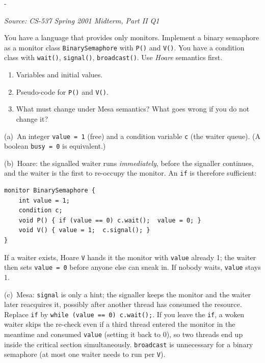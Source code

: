 \documentclass[11pt,a4paper]{article}
\makeatletter
\newcommand{\keepspace}[1]{\par\penalty-100\begingroup
  \setlength{\dimen@}{#1}\dimen@ii\pagegoal\advance\dimen@ii-\pagetotal
  \ifdim\dimen@>\dimen@ii\ifdim\dimen@ii>\z@\vfil\fi\break\fi\endgroup}
\newcounter{qn}[section]
\newenvironment{Qn}[4]{%
  \refstepcounter{qn}\keepspace{7\baselineskip}%
  \begin{tcolorbox}[qboxstyle, title={Q\thesection.\theqn\ \ [#1 \textbar\ #2]\ \ #4}]%
  {\footnotesize\color{g3}\textit{Source: #3}}\par\smallskip%
}{%
  \end{tcolorbox}%
}
\newenvironment{Sol}{%
  \begin{tcolorbox}[sboxstyle, title={Solution}]%
}{%
  \end{tcolorbox}\vspace{0.35em}%
}
\makeatother
\begin{document}
\begin{Qn}{Medium-Hard}{Lect 19}{CS-537 Spring 2001 Midterm, Part II Q1}{Binary semaphore from a Hoare (then Mesa) monitor}
You have a language that provides only monitors. Implement a binary
semaphore as a monitor class \texttt{BinarySemaphore} with \texttt{P()}
and \texttt{V()}. You have a condition class with \texttt{wait()},
\texttt{signal()}, \texttt{broadcast()}. Use \emph{Hoare} semantics first.

\begin{enumerate}
  \item[(a)] Variables and initial values.
  \item[(b)] Pseudo-code for \texttt{P()} and \texttt{V()}.
  \item[(c)] What must change under Mesa semantics? What goes wrong if you
        do not change it?
\end{enumerate}
\end{Qn}
\begin{Sol}
(a)~An integer \texttt{value = 1} (free) and a condition variable
\texttt{c} (the waiter queue). (A boolean \texttt{busy = 0} is
equivalent.)

(b)~Hoare: the signalled waiter runs \emph{immediately}, before the
signaller continues, and the waiter is the first to re-occupy the
monitor. An \texttt{if} is therefore sufficient:
\begin{lstlisting}[numbers=none]
monitor BinarySemaphore {
    int value = 1;
    condition c;
    void P() { if (value == 0) c.wait();  value = 0; }
    void V() { value = 1;  c.signal(); }
}
\end{lstlisting}
If a waiter exists, Hoare \texttt{V} hands it the monitor with
\texttt{value} already 1; the waiter then sets \texttt{value = 0} before
anyone else can sneak in. If nobody waits, \texttt{value} stays 1.

(c)~Mesa: \texttt{signal} is only a hint; the signaller keeps the
monitor and the waiter later reacquires it, possibly after another
thread has consumed the resource. Replace \texttt{if} by
\texttt{while (value == 0) c.wait();}. If you leave the \texttt{if}, a woken waiter skips the re-check even if a
third thread entered the monitor in the meantime and consumed
\texttt{value} (setting it back to 0), so two threads end up inside the
critical section simultaneously. \texttt{broadcast} is unnecessary for a
binary semaphore (at most one waiter needs to run per \texttt{V}).
\end{Sol}
\end{document}
